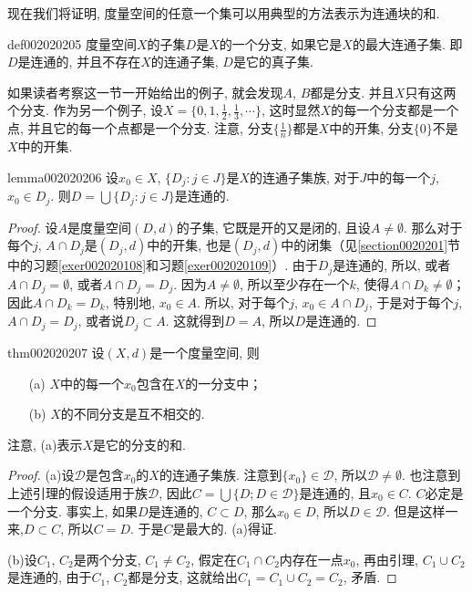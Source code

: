 现在我们将证明, 度量空间的任意一个集可以用典型的方法表示为连通块的和. 

\begin{definition}{}{def002020205}
度量空间$X$的子集$D$是$X$的一个分支, 如果它是$X$的最大连通子集. 即$D$是连通的, 并且不存在$X$的连通子集, $D$是它的真子集. 
\end{definition}

如果读者考察这一节一开始给出的例子, 就会发现$A$, $B$都是分支. 并且$X$只有这两个分支. 作为另一个例子, 设$X = \{0, 1, \frac{1}{2},\frac{1}{3}, \cdots\}$, 这时显然$X$的每一个分支都是一个点, 并且它的每一个点都是一个分支. 注意, 分支$\{\frac{1}{n}\}$都是$X$中的开集, 分支$\{0\}$不是$X$中的开集. 

\begin{lemma}{}{lemma002020206}
设$x_0 \in X$, $\{D_j : j \in J\}$是$X$的连通子集族, 对于$J$中的每一个$j$, $x_0 \in D_j$. 则$D = \bigcup{\{D_j : j \in J\}}$是连通的. 
\end{lemma}

\begin{proof}
设$A$是度量空间$(D, d)$的子集, 它既是开的又是闭的, 且设$A \neq \emptyset$. 那么对于每个$j$, $A \cap D_j$是$(D_j, d)$中的开集, 也是$(D_j, d)$中的闭集（见\ref{section0020201}节中的习题\ref{exer002020108}和习题\ref{exer002020109}）. 由于$D_j$是连通的, 所以, 或者$A \cap D_j = \emptyset$, 或者$A \cap D_j = D_j$. 因为$A \neq \emptyset$, 所以至少存在一个$k$, 使得$A \cap D_k \neq \emptyset$；因此$A \cap D_k = D_k$, 特别地, $x_0 \in A$. 所以, 对于每个$j$, $x_0 \in A \cap D_j$, 于是对于每个$j$, $A \cap D_j = D_j$, 或者说$D_j \subset A$. 这就得到$D = A$, 所以$D$是连通的. 
\end{proof}

\begin{theorem}{}{thm002020207}
设$(X, d)$是一个度量空间, 则
\begin{enumerate}
\item[(a)]$X$中的每一个$x_0$包含在$X$的一分支中；
\item[(b)]$X$的不同分支是互不相交的. 
\end{enumerate}
\end{theorem}

注意, (a)表示$X$是它的分支的和. 

\begin{proof}
(a)设$\mathscr{D}$是包含$x_0$的$X$的连通子集族. 注意到$\{x_0\} \in \mathscr{D}$, 所以$\mathscr{D} \neq \emptyset$. 也注意到上述引理的假设适用于族$\mathscr{D}$, 因此$C = \bigcup\{D; D \in \mathscr{D}\}$是连通的, 且$x_0 \in C$. $C$必定是一个分支. 事实上, 如果$D$是连通的, $C \subset D$, 那么$x_0 \in D$, 所以$D \in \mathscr{D}$. 但是这样一来,$D \subset C$, 所以$C=D$. 于是$C$是最大的. (a)得证. 

(b)设$C_1$, $C_2$是两个分支, $C_1 \neq C_2$, 假定在$C_1 \cap C_2$内存在一点$x_0$, 再由引理, $C_1 \cup C_2$是连通的, 由于$C_1$, $C_2$都是分支, 这就给出$C_1 = C_1 \cup C_2 = C_2$, 矛盾. 
\end{proof}

